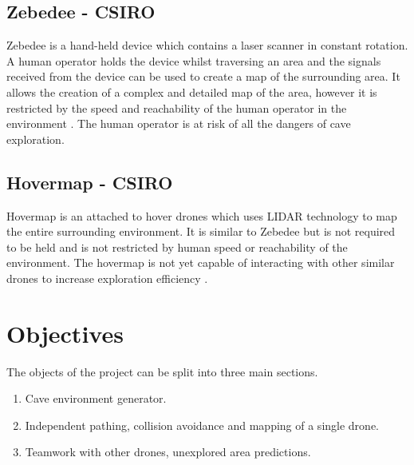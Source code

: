 \documentclass[12pt]{article}
\begin{document}
\subsection*{Zebedee - CSIRO}
Zebedee is a hand-held device which contains a laser scanner in constant rotation. A human operator holds the device whilst traversing an area and the signals received from the device can be used to create a map of the surrounding area. It allows the creation of a complex and detailed map of the area, however it is restricted by the speed and reachability of the human operator in the environment \cite{Zebedee}. The human operator is at risk of all the dangers of cave exploration.

\pagebreak[4] %

\subsection*{Hovermap - CSIRO}
Hovermap is an attached to hover drones which uses LIDAR technology to map the entire surrounding environment. It is similar to Zebedee but is not required to be held and is not restricted by human speed or reachability of the environment. The hovermap is not yet capable of interacting with other similar drones to increase exploration efficiency \cite{Hovermap}.

\section{Objectives}
The objects of the project can be split into three main sections.
\begin{enumerate}[label=(\roman*)]
  \item Cave environment generator.
  \item Independent pathing, collision avoidance and mapping of a single drone.
  \item Teamwork with other drones, unexplored area predictions.
\end{enumerate}
\end{document}
